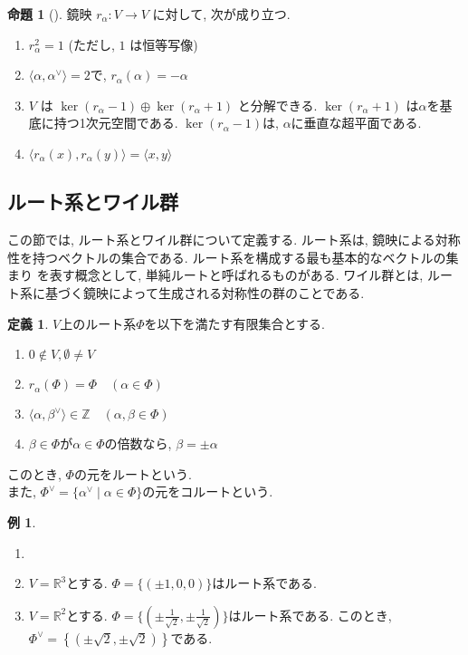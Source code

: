 \documentclass[
  a4paper, 
  12pt,
  ja=standard,
  xelatex,
  left=30truemm,
  right=30truemm,
  titlepage 
]{bxjsarticle}
\theoremstyle{definition}
\newtheorem{df}{定義}
\newtheorem{prop}[thm]{命題}
\newtheorem*{ex}{例}
\begin{document}
\begin{prop}[{\cite[5章2節命題2, 5章3節]{b3}}] 
  鏡映 $r_\alpha: V \to V $ に対して, 次が成り立つ. 
  \begin{enumerate} 
    \item $r_\alpha^2 = 1$ \quad (ただし, $1$ は恒等写像)
    \item $ \langle \alpha, \alpha^{\vee} \rangle = 2 $で, $r_\alpha(\alpha) = - \alpha$
    \item $V$ は $ \ker(r_\alpha - 1) \oplus \ker(r_\alpha + 1)$ と分解できる. $\ker(r_\alpha + 1)$ は$\alpha$を基底に持つ1次元空間である. 
    $ \ker(r_\alpha - 1)$は, $\alpha$に垂直な超平面である. 
    \item $\langle r_\alpha(x), r_\alpha(y) \rangle = \langle x, y \rangle $
  \end{enumerate}
\end{prop}

\subsection{ルート系とワイル群}
  この節では, ルート系とワイル群について定義する. ルート系は, 鏡映による対称性を持つベクトルの集合である. ルート系を構成する最も基本的なベクトルの集まり
  を表す概念として, 単純ルートと呼ばれるものがある. ワイル群とは, ルート系に基づく鏡映によって生成される対称性の群のことである.
\bigskip

\begin{df} 
  $V$上のルート系$\Phi$を以下を満たす有限集合とする.
  \begin{enumerate}
    \item $ 0 \notin V , \emptyset \neq V $
    \item $ r_\alpha (\Phi) = \Phi \quad ( \alpha \in \Phi )$
    \item $ \langle \alpha, \beta^{ \vee } \rangle \in \mathbb{Z} \quad ( \alpha, \beta \in \Phi )$
    \item $ \beta \in \Phi $が$ \alpha \in \Phi $の倍数なら, $ \beta = \pm \alpha $
  \end{enumerate}
  このとき, $ \Phi $の元をルートという. \\
  また, $ \Phi^{ \vee } = \{ \alpha^{ \vee } \mid \alpha \in \Phi \} $の元をコルートという.
\end{df}

\begin{ex}
  \begin{enumerate}
    \item[]
    \item $V = \mathbb{R}^3$とする. $\Phi = \{ (\pm1, 0, 0) \}$はルート系である.
    \item $V = \mathbb{R}^2$とする. $\Phi = \{ (\pm \frac{1}{\sqrt{2}}, \pm \frac{1}{\sqrt{2}}) \}$はルート系である.
    このとき, $ \Phi^{\vee} = \left\{ (\pm \sqrt{2}, \pm \sqrt{2})\right\} $である.
  \end{enumerate}
\end{ex}
\end{document}
